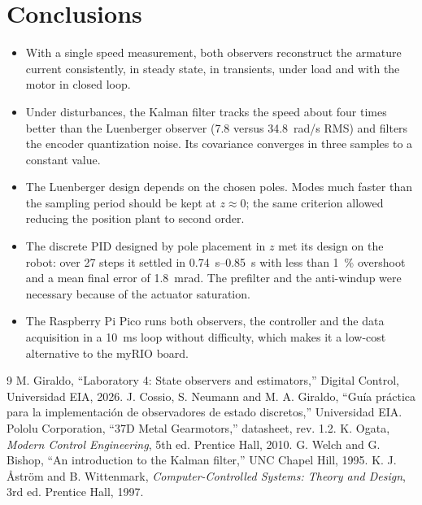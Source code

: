 \documentclass[conference,a4paper]{IEEEtran}
\begin{document}
\section{Conclusions}
\begin{itemize}
\item With a single speed measurement, both observers reconstruct the armature current consistently, in steady state, in transients, under load and with the motor in closed loop.
\item Under disturbances, the Kalman filter tracks the speed about four times better than the Luenberger observer (7.8 versus \SI{34.8}{rad/s} RMS) and filters the encoder quantization noise. Its covariance converges in three samples to a constant value.
\item The Luenberger design depends on the chosen poles. Modes much faster than the sampling period should be kept at $z\approx0$; the same criterion allowed reducing the position plant to second order.
\item The discrete PID designed by pole placement in $z$ met its design on the robot: over 27 steps it settled in \SIrange{0.74}{0.85}{s} with less than \SI{1}{\percent} overshoot and a mean final error of \SI{1.8}{mrad}. The prefilter and the anti-windup were necessary because of the actuator saturation.
\item The Raspberry Pi Pico runs both observers, the controller and the data acquisition in a \SI{10}{ms} loop without difficulty, which makes it a low-cost alternative to the myRIO board.
\end{itemize}

\begin{thebibliography}{9}
 M. Giraldo, ``Laboratory 4: State observers and estimators,'' Digital Control, Universidad EIA, 2026.
 J. Cossio, S. Neumann and M. A. Giraldo, ``Guía práctica para la implementación de observadores de estado discretos,'' Universidad EIA.
 Pololu Corporation, ``37D Metal Gearmotors,'' datasheet, rev. 1.2.
 K. Ogata, \emph{Modern Control Engineering}, 5th ed. Prentice Hall, 2010.
 G. Welch and G. Bishop, ``An introduction to the Kalman filter,'' UNC Chapel Hill, 1995.
 K. J. Åström and B. Wittenmark, \emph{Computer-Controlled Systems: Theory and Design}, 3rd ed. Prentice Hall, 1997.
\end{thebibliography}
\end{document}
